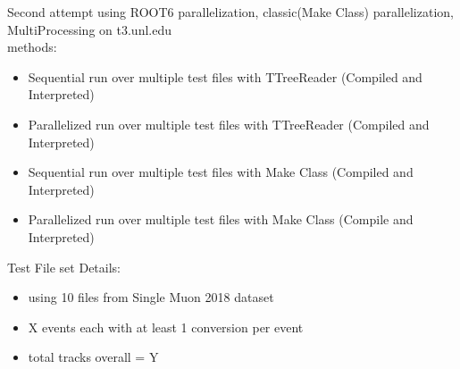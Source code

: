 \documentclass[10pt]{beamer}
\begin{document}
\begin{frame}
Second attempt using ROOT6 parallelization, classic(Make Class) parallelization, MultiProcessing on t3.unl.edu\\
methods:\\
\begin{itemize}
\item Sequential run over multiple test files with TTreeReader (Compiled and Interpreted)
\item Parallelized run over multiple test files with TTreeReader (Compiled and Interpreted)
\item Sequential run over multiple test files with Make Class (Compiled and Interpreted)
\item Parallelized run over multiple test files with Make Class (Compile and Interpreted)
\end{itemize} 

Test File set Details:\\
\begin{itemize}
\item using 10 files from Single Muon 2018 dataset
\item X events each with at least 1 conversion per event
\item total tracks overall = Y
\end{itemize}

\end{frame}
\end{document}
